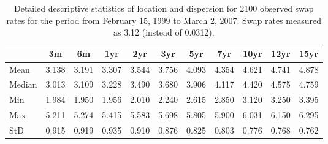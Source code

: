 \begin{table}[ht]
    \begin{center}
        {\footnotesize
        \begin{tabular}{l|cccccccccc}
        \hline \hline
                        & 3m    & 6m    & 1yr   & 2yr   & 3yr   & 5yr   & 7yr   & 10yr  & 12yr  & 15yr   \\
            \hline
                Mean   & 3.138 & 3.191 & 3.307 & 3.544 & 3.756 & 4.093 & 4.354 & 4.621 & 4.741 & 4.878  \\
                Median & 3.013 & 3.109 & 3.228 & 3.490 & 3.680 & 3.906 & 4.117 & 4.420 & 4.575 & 4.759  \\
                Min    & 1.984 & 1.950 & 1.956 & 2.010 & 2.240 & 2.615 & 2.850 & 3.120 & 3.250 & 3.395  \\
                Max    & 5.211 & 5.274 & 5.415 & 5.583 & 5.698 & 5.805 & 5.900 & 6.031 & 6.150 & 6.295  \\
                StD    & 0.915 & 0.919 & 0.935 & 0.910 & 0.876 & 0.825 & 0.803 & 0.776 & 0.768 & 0.762  \\
            \hline \hline
        \end{tabular}}
    \end{center}
    \caption{Detailed descriptive statistics of location and dispersion for
    2100 observed swap rates for the period from
    February 15, 1999 to March 2, 2007. Swap rates measured as 3.12 (instead of 0.0312).}
    \label{Tab:DescripStatsRawDataDetail}
\end{table}
